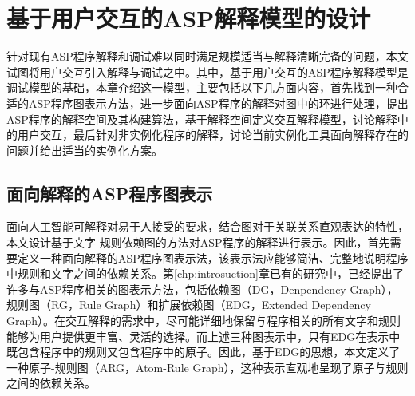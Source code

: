 \chapter{基于用户交互的ASP解释模型的设计}
针对现有ASP程序解释和调试难以同时满足规模适当与解释清晰完备的问题，本文试图将用户交互引入解释与调试之中。其中，基于用户交互的ASP程序解释模型是调试模型的基础，本章介绍这一模型，主要包括以下几方面内容，首先找到一种合适的ASP程序图表示方法，进一步面向ASP程序的解释对图中的环进行处理，提出ASP程序的解释空间及其构建算法，基于解释空间定义交互解释模型，讨论解释中的用户交互，最后针对非实例化程序的解释，讨论当前实例化工具面向解释存在的问题并给出适当的实例化方案。
\section{面向解释的ASP程序图表示}
面向人工智能可解释对易于人接受的要求，结合图对于关联关系直观表达的特性，本文设计基于文字-规则依赖图的方法对ASP程序的解释进行表示。因此，首先需要定义一种面向解释的ASP程序图表示法，该表示法应能够简洁、完整地说明程序中规则和文字之间的依赖关系。第\ref{chp:introsuction}章已有的研究中，已经提出了许多与ASP程序相关的图表示方法，包括依赖图（DG，Denpendency Graph）\cite{apt1994logic}，规则图（RG，Rule Graph）\cite{dimopoulos1996graph}和扩展依赖图（EDG，Extended Dependency Graph）\cite{brignoli2014characterizing}。在交互解释的需求中，尽可能详细地保留与程序相关的所有文字和规则能够为用户提供更丰富、灵活的选择。而上述三种图表示中，只有EDG在表示中既包含程序中的规则又包含程序中的原子。因此，基于EDG的思想，本文定义了一种原子-规则图（ARG，Atom-Rule Graph），这种表示直观地呈现了原子与规则之间的依赖关系。

